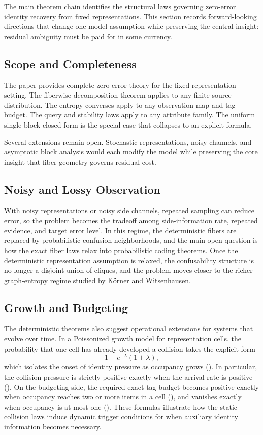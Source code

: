 The main theorem chain identifies the structural laws governing zero-error identity recovery from fixed representations. This section records forward-looking directions that change one model assumption while preserving the central insight: residual ambiguity must be paid for in some currency.

\subsection{Scope and Completeness}

The paper provides complete zero-error theory for the fixed-representation setting. The fiberwise decomposition theorem applies to any finite source distribution. The entropy converses apply to any observation map and tag budget. The query and stability laws apply to any attribute family. The uniform single-block closed form is the special case that collapses to an explicit formula.

Several extensions remain open. Stochastic representations, noisy channels, and asymptotic block analysis would each modify the model while preserving the core insight that fiber geometry governs residual cost.

\subsection{Noisy and Lossy Observation}

With noisy representations or noisy side channels, repeated sampling can reduce error, so the problem becomes the tradeoff among side-information rate, repeated evidence, and target error level. In this regime, the deterministic fibers are replaced by probabilistic confusion neighborhoods, and the main open question is how the exact fiber laws relax into probabilistic coding theorems. Once the deterministic representation assumption is relaxed, the confusability structure is no longer a disjoint union of cliques, and the problem moves closer to the richer graph-entropy regime studied by K\"orner and Witsenhausen.

\subsection{Growth and Budgeting}

The deterministic theorems also suggest operational extensions for systems that evolve over time. In a Poissonized growth model for representation cells, the probability that one cell has already developed a collision takes the explicit form
\[
1 - e^{-\lambda}(1+\lambda),
\]
which isolates the onset of identity pressure as occupancy grows (). In particular, the collision pressure is strictly positive exactly when the arrival rate is positive (). On the budgeting side, the required exact tag budget becomes positive exactly when occupancy reaches two or more items in a cell (), and vanishes exactly when occupancy is at most one (). These formulas illustrate how the static collision laws induce dynamic trigger conditions for when auxiliary identity information becomes necessary.

